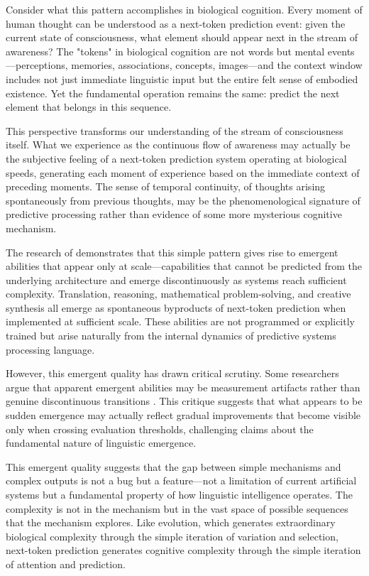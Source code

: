 Consider what this pattern accomplishes in biological cognition. Every moment of human thought can be understood as a next-token prediction event: given the current state of consciousness, what element should appear next in the stream of awareness? The "tokens" in biological cognition are not words but mental events—perceptions, memories, associations, concepts, images—and the context window includes not just immediate linguistic input but the entire felt sense of embodied existence. Yet the fundamental operation remains the same: predict the next element that belongs in this sequence.

This perspective transforms our understanding of the stream of consciousness itself. What we experience as the continuous flow of awareness may actually be the subjective feeling of a next-token prediction system operating at biological speeds, generating each moment of experience based on the immediate context of preceding moments. The sense of temporal continuity, of thoughts arising spontaneously from previous thoughts, may be the phenomenological signature of predictive processing rather than evidence of some more mysterious cognitive mechanism.

The research of \textcite{wei2022emergent} demonstrates that this simple pattern gives rise to emergent abilities that appear only at scale—capabilities that cannot be predicted from the underlying architecture and emerge discontinuously as systems reach sufficient complexity. Translation, reasoning, mathematical problem-solving, and creative synthesis all emerge as spontaneous byproducts of next-token prediction when implemented at sufficient scale. These abilities are not programmed or explicitly trained but arise naturally from the internal dynamics of predictive systems processing language.

However, this emergent quality has drawn critical scrutiny. Some researchers argue that apparent emergent abilities may be measurement artifacts rather than genuine discontinuous transitions \parencite{schaeffer2023emergent}. This critique suggests that what appears to be sudden emergence may actually reflect gradual improvements that become visible only when crossing evaluation thresholds, challenging claims about the fundamental nature of linguistic emergence.

This emergent quality suggests that the gap between simple mechanisms and complex outputs is not a bug but a feature—not a limitation of current artificial systems but a fundamental property of how linguistic intelligence operates. The complexity is not in the mechanism but in the vast space of possible sequences that the mechanism explores. Like evolution, which generates extraordinary biological complexity through the simple iteration of variation and selection, next-token prediction generates cognitive complexity through the simple iteration of attention and prediction.

